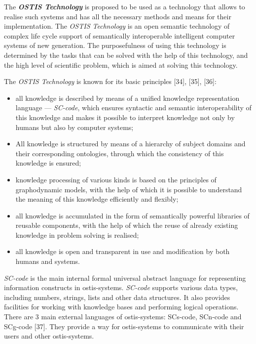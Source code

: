 \documentclass[10 pt]{extarticle}
\begin{document}
\begin{multicols}{2}
\setlength{\parskip}{3 pt}

    The \textbf{\textit{OSTIS Technology}} is proposed to be used as a
technology that allows to realise such systems and has all the necessary methods and means for their implementation. The \textit{OSTIS Technology} is an open semantic technology of complex life cycle support of semantically interoperable intelligent computer systems of new generation. The purposefulness of using this technology is determined by the tasks that can be solved with the help of this technology, and the high level of scientific problem, which is aimed at solving this technology.

\setlength{\parskip}{0 pt}

The \textit{OSTIS Technology} is known for its basic principles [34], [35], [36]:
    

\begin{itemize}
    \item \setlength{\parskip}{3 pt} all knowledge is described by means of a unified knowledge
representation language — \textit{SC-code}, which ensures syntactic and semantic interoperability of this knowledge and makes it possible to interpret knowledge not only by humans but also by computer systems;
    \item \setlength{\parskip}{0 pt} All knowledge is structured by means of a hierarchy of subject domains 
and their corresponding ontologies, through which the consistency of this knowledge is ensured;
    \item knowledge processing of various kinds is based on the principles of
graphodynamic models, with the help of which it is possible to understand the
meaning of this knowledge efficiently and flexibly;
    \item  all knowledge is accumulated in the form of semantically powerful
libraries of reusable components, with the help of which the reuse of already existing knowledge in problem solving is realised;
    \item  all knowledge is open and transparent in use and
modification by both humans and systems.
\end{itemize}

\setlength{\parskip}{3 pt}

\textit{SC-code} is the main internal formal universal abstract language for
representing information constructs in ostis-systems. \textit{SC-code} supports various data types, including numbers, strings, lists and other data structures. It also provides facilities for working with knowledge bases and performing logical operations. There are 3 main external languages of ostis-systems: SCs-code, SCn-code and SCg-code [37]. They provide a way for ostis-systems to communicate with their users and other ostis-systems.


\end{multicols}
\end{document}
